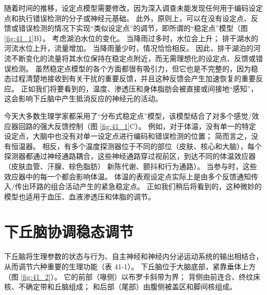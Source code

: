 随着时间的推移，设定点模型需要修改，因为深入调查未能发现任何用于编码设定点和执行错误检测的分子或神经元基础。 此外，原则上，可以在没有设定点、反馈或错误检测的情况下实现“类似设定点”的调节，即所谓的“稳定点”模型（图 \ref{fig:41_1}B）。 考虑湖泊水位的变化。 当降雨过多时，水位会上升； 排干湖水的河流水位上升，流量增加。 当降雨量少时，情况恰恰相反。 因此，排干湖泊的河流不断变化的流量将其水位保持在稳定点附近，而无需理想化的设定点、反馈或错误检测。 虽然稳定点模型的各个方面都很有吸引力，但它也是不完整的，因为稳态过程清楚地接收到有关干扰的重要反馈，并且这种反馈会产生加速恢复的重要反应。 正如我们将要看到的，温度、渗透压和身体脂肪会被直接或间接地“感知”，这会影响下丘脑中产生抵消反应的神经元的活动。

今天大多数生理学家都采用了“分布式稳定点”模型，该模型结合了对多个感觉/效应器回路的强大反馈控制（图 \ref{fig:41_1}C）。 例如，对于体温，没有单一的特定设定点，大脑中也没有对单一设定点进行编码和错误检测的位置； 简而言之，没有恒温器。 相反，有多个温度探测器位于不同的部位（皮肤、核心和大脑），每个探测器都通过神经通路耦合，这些神经通路穿过视前区，到达不同的体温效应器（皮肤血管、汗腺、棕色脂肪） 新陈代谢、颤抖和行为通路）。 当参与时，这些效应器中的每一个都会影响体温。 体温的表观设定点实际上是由多个反馈通知传入/传出环路的组合活动产生的紧急稳定点。 正如我们稍后将看到的，这种微妙的模型也适用于血压、血液渗透压和体脂的调节。

\section{下丘脑协调稳态调节}
下丘脑将生理参数的状态与行为、自主神经和神经内分泌运动系统的输出相结合，从而调节六种重要的生理功能（表 41-1）。 
下丘脑位于大脑底部，紧靠垂体上方（图 \ref{fig:41_2}）。 
它的前部（喙侧）以布罗卡斜带为界； 背侧由前连合、终纹床核、不确定带和丘脑组成； 和后部（尾部）由腹侧被盖区和脚间核组成。

